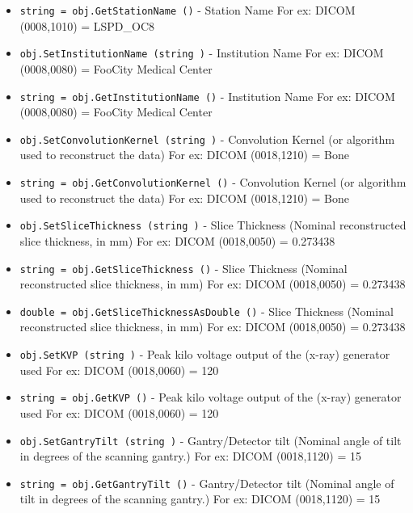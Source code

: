 \begin{itemize}
\item  \verb|string = obj.GetStationName ()| -  Station Name
 For ex: DICOM (0008,1010) = LSPD\_OC8

\item  \verb|obj.SetInstitutionName (string )| -  Institution Name
 For ex: DICOM (0008,0080) = FooCity Medical Center

\item  \verb|string = obj.GetInstitutionName ()| -  Institution Name
 For ex: DICOM (0008,0080) = FooCity Medical Center

\item  \verb|obj.SetConvolutionKernel (string )| -  Convolution Kernel (or algorithm used to reconstruct the data)
 For ex: DICOM (0018,1210) = Bone

\item  \verb|string = obj.GetConvolutionKernel ()| -  Convolution Kernel (or algorithm used to reconstruct the data)
 For ex: DICOM (0018,1210) = Bone

\item  \verb|obj.SetSliceThickness (string )| -  Slice Thickness (Nominal reconstructed slice thickness, in mm)
 For ex: DICOM (0018,0050) = 0.273438

\item  \verb|string = obj.GetSliceThickness ()| -  Slice Thickness (Nominal reconstructed slice thickness, in mm)
 For ex: DICOM (0018,0050) = 0.273438

\item  \verb|double = obj.GetSliceThicknessAsDouble ()| -  Slice Thickness (Nominal reconstructed slice thickness, in mm)
 For ex: DICOM (0018,0050) = 0.273438

\item  \verb|obj.SetKVP (string )| -  Peak kilo voltage output of the (x-ray) generator used
 For ex: DICOM (0018,0060) = 120

\item  \verb|string = obj.GetKVP ()| -  Peak kilo voltage output of the (x-ray) generator used
 For ex: DICOM (0018,0060) = 120

\item  \verb|obj.SetGantryTilt (string )| -  Gantry/Detector tilt (Nominal angle of tilt in degrees of the scanning
 gantry.)
 For ex: DICOM (0018,1120) = 15

\item  \verb|string = obj.GetGantryTilt ()| -  Gantry/Detector tilt (Nominal angle of tilt in degrees of the scanning
 gantry.)
 For ex: DICOM (0018,1120) = 15


\end{itemize}
